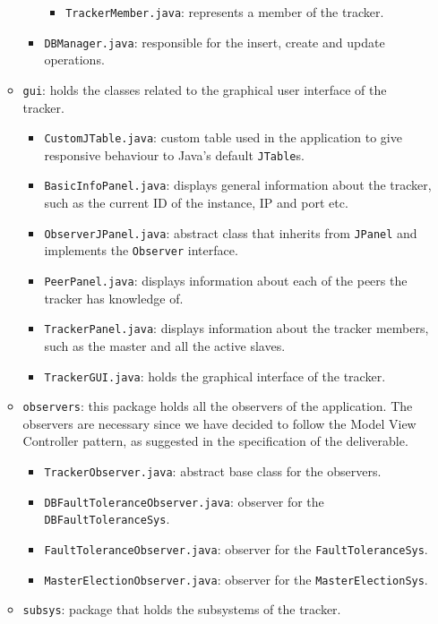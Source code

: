 \documentclass[twoside,a4paper,10pt]{article}
\begin{document}
\begin{itemize}
\begin{itemize}
\begin{itemize}
\begin{itemize}
      \item \texttt{TrackerMember.java}: represents a member of the tracker.
      \end{itemize}
    \item \texttt{DBManager.java}: responsible for the insert, create and
      update operations.
    \end{itemize}
  \item \texttt{gui}: holds the classes related to the graphical user interface
    of the tracker.
    \begin{itemize}
    \item \texttt{CustomJTable.java}: custom table used in the application to
      give responsive behaviour to Java's default \texttt{JTable}s.
    \item \texttt{BasicInfoPanel.java}: displays general information about
      the tracker, such as the current ID of the instance, IP and port etc.
    \item \texttt{ObserverJPanel.java}: abstract class that inherits from
      \texttt{JPanel} and implements the \texttt{Observer} interface.
    \item \texttt{PeerPanel.java}: displays information about each of the
      peers the tracker has knowledge of.
    \item \texttt{TrackerPanel.java}: displays information about the tracker
      members, such as the master and all the active slaves.
    \item \texttt{TrackerGUI.java}: holds the graphical interface of the
      tracker.
    \end{itemize}
  \item \texttt{observers}: this package holds all the observers of the
    application.
    The observers are necessary since we have decided to follow the Model View
    Controller pattern, as suggested in the specification of the deliverable.
    
    \begin{itemize}
    \item \texttt{TrackerObserver.java}: abstract base class for the observers.
    \item \texttt{DBFaultToleranceObserver.java}: observer for the
      \texttt{DBFaultToleranceSys}.
    \item \texttt{FaultToleranceObserver.java}: observer for the
      \texttt{FaultToleranceSys}.
    \item \texttt{MasterElectionObserver.java}: observer for the
      \texttt{MasterElectionSys}.
    \end{itemize}
  \item \texttt{subsys}: package that holds the subsystems of the tracker.
    

\end{itemize}
\end{itemize}
\end{document}
